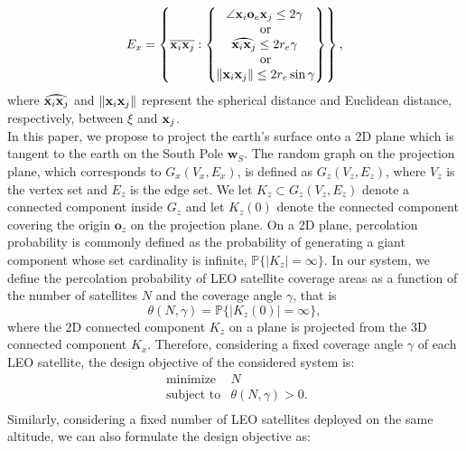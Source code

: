 \documentclass[final]{IEEEtran}
\begin{document}
\begin{equation}
    E_x=\left\{\overline{\xi\xj}:    
    \left\{\begin{matrix}
 \angle \xi\oe\xj\leq 2\gamma \,\\
{\rm or}\\
\wideparen{\xi\xj}\leq 2r_e \gamma \, \\
{\rm or}\\
\|\xi\xj\|\leq 2r_e\sin\gamma

\end{matrix}\right\}\right\},
\end{equation}
where $\wideparen{\xi\xj}$ and $\|\textbf{x}_i\textbf{x}_j\|$ represent the spherical distance and Euclidean distance, respectively, between $\xi$ and $\textbf{x}_j$.\\
\indent In this paper, we propose to project the earth's surface onto a 2D plane which is tangent to the earth on the South Pole $\textbf{w}_S$. The random graph on the projection plane, which corresponds to $G_x(V_x,E_x)$, is defined as $G_z(V_z,E_z)$, where $V_z$ is the vertex set and $E_z$ is the edge set. We let $K_z\subset G_z(V_z,E_z)$ denote a connected component inside $G_z$ and let $K_z(0)$ denote the connected component covering the origin $\textbf{o}_z$ on the projection plane. On a 2D plane, percolation probability is commonly defined as the probability of generating a giant component whose set cardinality is infinite, \ie $\mathbb{P}\{|K_z|=\infty\}$. In our system, we define the percolation probability of LEO satellite coverage areas as a function of the number of satellites $N$ and the coverage angle $\gamma$, that is
\begin{equation}
    \theta(N,\gamma)=\mathbb{P}\{|K_z(0)|=\infty\},
\label{defineper}
\end{equation}
where the 2D connected component $K_z$ on a plane is projected from the 3D connected component $K_x$. Therefore, considering a fixed coverage angle $\gamma$ of each LEO satellite, the design objective of the considered system is:
\begin{equation}
    \begin{array}{ll}
       \text{ minimize}  & N  \\
       \text{ subject to}  & \theta(N,\gamma)>0.  \\
    \end{array}
    \label{design1}
\end{equation}
Similarly, considering a fixed number of LEO satellites deployed on the same altitude, we can also formulate the design objective as:
\end{document}
